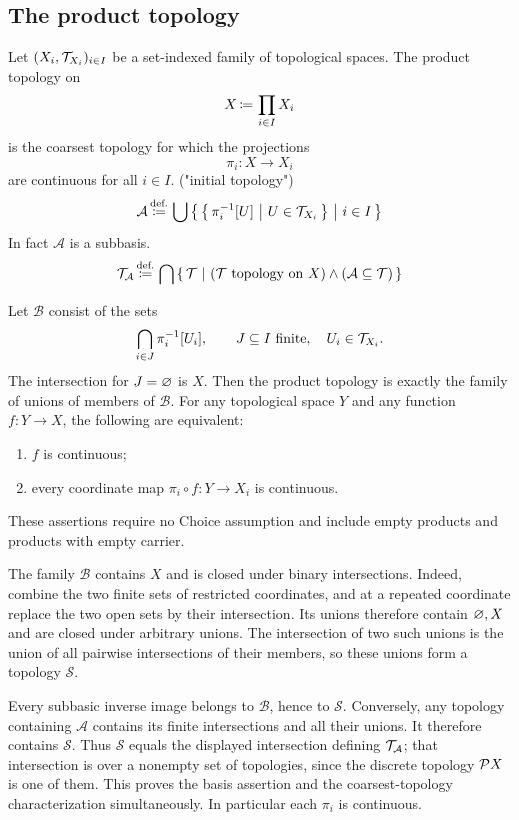 \subsection{The product topology}
Let $(X_i,\mathcal{T}_{X_i})_{i\in I}$ be a set-indexed family of topological
spaces. The product topology on
\[
X\,{\coloneqq}\, \prod_{i\in I}X_i
\]
is the coarsest topology for which the projections
\[
\pi_i:X\to X_i
\]
are continuous for all $i\in I$.
("initial topology")
\[
\mathcal{A}\,{\stackrel{{\textrm{def.}}}{\coloneqq}}\,\bigcup \left\{\,\left\{\,\pi^{-1}_i[U]\ \middle|\ U\in\mathcal{T}_{X_i}\,\right\}\ \middle|\ i\in I\,\right\}
\]
In fact $\mathcal{A}$ is a subbasis.
\[
\mathcal{T}_\mathcal{A}\,{\stackrel{{\textrm{def.}}}{\coloneqq}}\,\bigcap\left\{\,\mathcal{T}\ \middle|\ (\mathcal{T}\mbox{ topology on }X)\land (\mathcal{A}\subseteq\mathcal{T}) \,\right\}
\]

\begin{proposition}
\label{prop:product_topology_basis}
Let $\mathcal B$ consist of the sets
\[
\bigcap_{i\in J}\pi_i^{-1}[U_i],
\qquad J\subseteq I\text{ finite},\quad U_i\in\mathcal{T}_{X_i}.
\]
The intersection for $J=\varnothing$ is $X$. Then the product topology
is exactly the family of unions of members of $\mathcal B$. For any
topological space $Y$ and any function $f:Y\to X$, the following are
equivalent:
\begin{enumerate}
\item $f$ is continuous;
\item every coordinate map $\pi_i\circ f:Y\to X_i$ is continuous.
\end{enumerate}
These assertions require no Choice assumption and include empty products
and products with empty carrier.
\end{proposition}
\Proof
The family $\mathcal B$ contains $X$ and is closed under binary
intersections. Indeed, combine the two finite sets of restricted
coordinates, and at a repeated coordinate replace the two open sets
by their intersection. Its unions therefore contain $\varnothing,X$
and are closed under arbitrary unions. The intersection of two such
unions is the union of all pairwise intersections of their members,
so these unions form a topology $\mathcal S$.

Every subbasic inverse image belongs to $\mathcal B$, hence to
$\mathcal S$. Conversely, any topology containing $\mathcal A$
contains its finite intersections and all their unions. It therefore
contains $\mathcal S$. Thus $\mathcal S$ equals the displayed
intersection defining $\mathcal{T}_{\mathcal A}$; that intersection is over
a nonempty set of topologies, since the discrete topology $\mathcal{P} X$
is one of them. This proves the basis assertion and the coarsest-topology
characterization simultaneously. In particular each $\pi_i$ is continuous.

